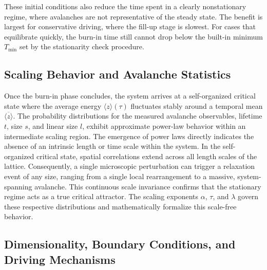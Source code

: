 These initial conditions also reduce the time spent in a clearly nonstationary regime, where avalanches are not representative of the steady state. The benefit is largest for conservative driving, where the fill-up stage is slowest. For cases that equilibrate quickly, the burn-in time still cannot drop below the built-in minimum $T_{\min}$ set by the stationarity check procedure.

\subsection{Scaling Behavior and Avalanche Statistics}

Once the burn-in phase concludes, the system arrives at a self-organized critical state where the average energy $\langle z \rangle(\tau)$ fluctuates stably around a temporal mean $\overline{\langle z \rangle}$. The probability distributions for the measured avalanche observables, lifetime $t$, size $s$, and linear size $l$, exhibit approximate power-law behavior within an intermediate scaling region. The emergence of power laws directly indicates the absence of an intrinsic length or time scale within the system. In the self-organized critical state, spatial correlations extend across all length scales of the lattice. Consequently, a single microscopic perturbation can trigger a relaxation event of any size, ranging from a single local rearrangement to a massive, system-spanning avalanche. This continuous scale invariance confirms that the stationary regime acts as a true critical attractor. The scaling exponents $\alpha$, $\tau$, and $\lambda$ govern these respective distributions and mathematically formalize this scale-free behavior.

\subsection{Dimensionality, Boundary Conditions, and Driving Mechanisms}


